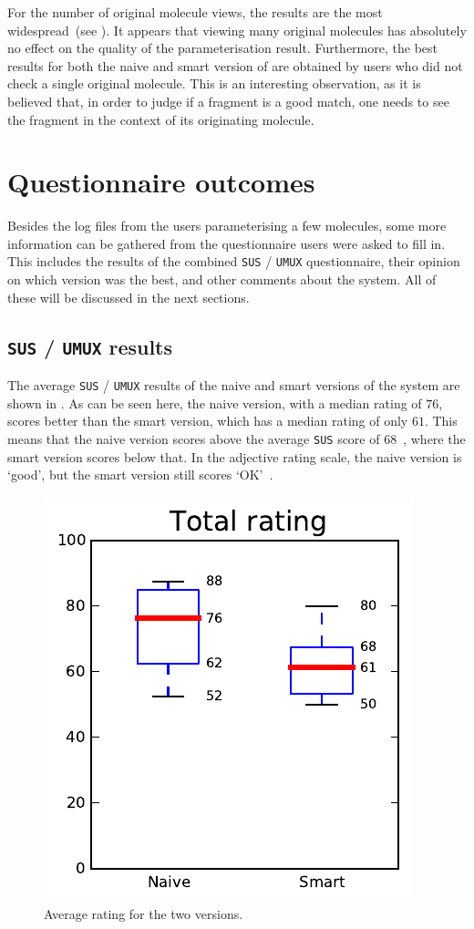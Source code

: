 For the number of original molecule views, the results are the most widespread~(see ). It appears that viewing many original molecules has absolutely no effect on the quality of the parameterisation result. Furthermore, the best results for both the naive and smart version of \oframp{} are obtained by users who did not check a single original molecule. This is an interesting observation, as it is believed that, in order to judge if a fragment is a good match, one needs to see the fragment in the context of its originating molecule.


\section{Questionnaire outcomes}
Besides the log files from the users parameterising a few molecules, some more information can be gathered from the questionnaire users were asked to fill in. This includes the results of the combined \verb|SUS| / \verb|UMUX| questionnaire, their opinion on which version was the best, and other comments about the system. All of these will be discussed in the next sections.

\subsection{\texttt{SUS} / \texttt{UMUX} results}
The average \verb|SUS| / \verb|UMUX| results of the naive and smart versions of the system are shown in . As can be seen here, the naive version, with a median rating of $76$, scores better than the smart version, which has a median rating of only $61$. This means that the naive version scores above the average \verb|SUS| score of 68~\cite{}, where the smart version scores below that. In the adjective rating scale, the naive version is `good', but the smart version still scores `OK'~\cite{}.

\begin{figure}[h!]
\center
\includegraphics[width=.32\textwidth]{img/graphs/4a_10.pdf}
\caption{Average rating for the two versions.}
\end{figure}

